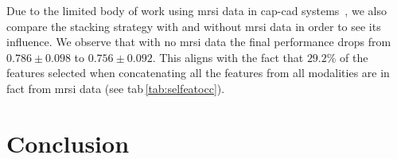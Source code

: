 \documentclass[a4paper,num-refs]{wiley-article}
\begin{document}
Due to the limited body of work using \ac{mrsi} data in \ac{cap}-\ac{cad}
systems~\cite{lemaitre2015computer}, we also compare the stacking strategy with
and without \ac{mrsi} data in order to see its influence. We observe that with
no \ac{mrsi} data the final performance drops from 
$0.786 \pm 0.098$ to $0.756 \pm 0.092$.
This aligns with the fact that $29.2\%$ of the features selected when
concatenating all the features from all modalities are in fact from \ac{mrsi}
data (see \Ac{tab}\,\ref{tab:selfeatocc}).


\section{Conclusion}
\label{sec:conclusion}


\end{document}
